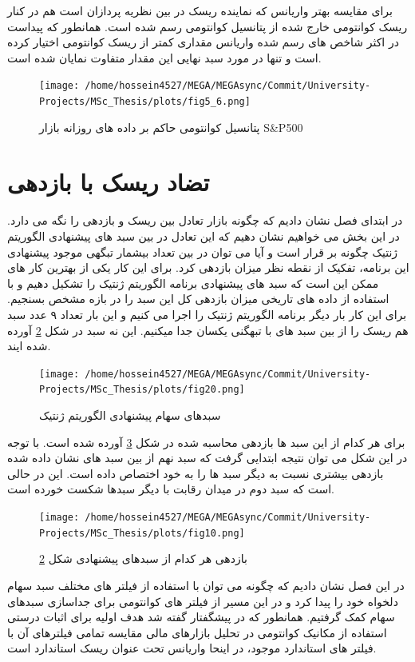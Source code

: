 \documentclass[a4paper,titlepage,12pt,fleqn,oneside]{report}
\begin{document}
	برای مقایسه بهتر واریانس که نماینده ریسک در بین نظریه پردازان است هم در کنار ریسک کوانتومی خارج شده از پتانسیل کوانتومی رسم شده است.  همانطور که پیداست در اکثر شاخص های رسم شده واریانس مقداری کمتر از ریسک کوانتومی اختیار کرده است و تنها در مورد سبد نهایی این مقدار متفاوت نمایان شده است. 
	
	\begin{figure}[ptb]
		\centering
		\texttt{[image: /home/hossein4527/MEGA/MEGAsync/Commit/University-Projects/MSc\_Thesis/plots/fig5\_6.png]}
		\caption{پتانسیل کوانتومی حاکم بر داده های روزانه بازار S\&P500}
		\label{fig:5.6}
	\end{figure}
	\section{تضاد ریسک با  بازدهی}
	در ابتدای فصل نشان دادیم که چگونه بازار تعادل بین ریسک و بازدهی را نگه می دارد. در این بخش می خواهیم نشان دهیم که این تعادل در بین سبد های پیشنهادی الگوریتم ژنتیک چگونه بر قرار است و آیا می توان در بین تعداد بیشمار تبگهی موجود پیشنهادی این برنامه، تفکیک از نقطه نظر میزان بازدهی کرد. برای این کار یکی از بهترین کار های ممکن این است که سبد های پیشنهادی برنامه الگوریتم ژنتیک را تشکیل دهیم و با استفاده از داده های تاریخی میزان بازدهی کل این سبد را در بازه مشخص بسنجیم. برای این کار بار دیگر برنامه الگوریتم ژنتیک را اجرا می کنیم و این بار تعداد ۹ عدد سبد هم ریسک را از بین سبد های با تبهگنی یکسان جدا میکنیم. این نه سبد در شکل 
	\ref{fig:5.7} 
	آورده شده ایند.
	\begin{figure}[ptb]
		\centering
		\texttt{[image: /home/hossein4527/MEGA/MEGAsync/Commit/University-Projects/MSc\_Thesis/plots/fig20.png]}
		\caption{سبدهای سهام پیشنهادی الگوریتم ژنتیک}
		\label{fig:5.7}
	\end{figure}
	برای هر کدام از این سبد ها بازدهی محاسبه شده در شکل
	\ref{fig:5.8}
	آورده شده است. با توجه در این شکل می توان نتیجه ابتدایی گرفت که سبد نهم از بین سبد های نشان داده شده بازدهی بیشتری نسبت به دیگر سبد ها را به خود اختصاص داده است. این در حالی است که سبد دوم در میدان رقابت با دیگر سبدها شکست خورده است. 
	\begin{figure}[ptb]
		\centering
		\texttt{[image: /home/hossein4527/MEGA/MEGAsync/Commit/University-Projects/MSc\_Thesis/plots/fig10.png]}
		\caption{بازدهی هر کدام از سبدهای پیشنهادی شکل \ref{fig:5.7}}
		\label{fig:5.8}
	\end{figure}
	در این فصل نشان دادیم که چگونه می توان با استفاده از فیلتر های مختلف سبد سهام دلخواه خود را پیدا کرد و در این مسیر از فیلتر های کوانتومی برای جداسازی سبدهای سهام کمک گرفتیم. همانطور که در پیشگفتار گفته شد هدف اولیه برای اثبات درستی استفاده از مکانیک کوانتومی در تحلیل بازارهای مالی مقایسه تمامی فیلترهای آن با فیلتر های استاندارد موجود، در اینحا واریانس تحت عنوان ریسک استاندارد است. 
\end{document}
